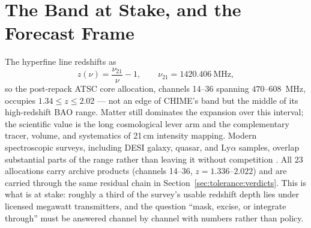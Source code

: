 \section{The Band at Stake, and the Forecast Frame}
\label{sec:tolerance:scope}

The hyperfine line redshifts as
\begin{equation}
\label{eq:tolerance:zmap}
z(\nu) = \frac{\nu_{21}}{\nu} - 1, \qquad \nu_{21} = 1420.406~\text{MHz},
\end{equation}
so the post-repack ATSC core allocation, channels 14--36 spanning $470$--$608$~MHz, occupies $1.34 \le z \le 2.02$ --- not an edge of CHIME's band but the middle of its high-redshift BAO range.  Matter still dominates the expansion over this interval; the scientific value is the long cosmological lever arm and the complementary tracer, volume, and systematics of 21\,cm intensity mapping.  Modern spectroscopic surveys, including DESI galaxy, quasar, and Ly$\alpha$ samples, overlap substantial parts of the range rather than leaving it without competition \cite{desi2024iii,desi2024lya}. All 23 allocations carry archive products (channels 14--36, $z = 1.336$--$2.022$) and are carried through the same residual chain in Section~\ref{sec:tolerance:verdicts}.  This is what is at stake: roughly a third of the survey's usable redshift depth lies under licensed megawatt transmitters, and the question ``mask, excise, or integrate through'' must be answered channel by channel with numbers rather than policy.

